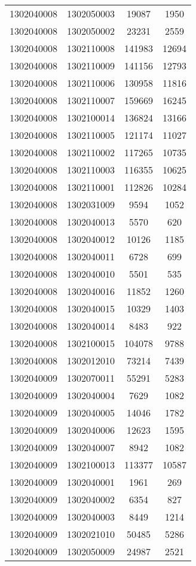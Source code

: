 \begin{longtable}[h]{llcc}
		1302040008 & 1302050003 & 19087 & 1950\\
		1302040008 & 1302050002 & 23231 & 2559\\
		1302040008 & 1302110008 & 141983 & 12694\\
		1302040008 & 1302110009 & 141156 & 12793\\
		1302040008 & 1302110006 & 130958 & 11816\\
		1302040008 & 1302110007 & 159669 & 16245\\
		1302040008 & 1302100014 & 136824 & 13166\\
		1302040008 & 1302110005 & 121174 & 11027\\
		1302040008 & 1302110002 & 117265 & 10735\\
		1302040008 & 1302110003 & 116355 & 10625\\
		1302040008 & 1302110001 & 112826 & 10284\\
		1302040008 & 1302031009 & 9594 & 1052\\
		1302040008 & 1302040013 & 5570 & 620\\
		1302040008 & 1302040012 & 10126 & 1185\\
		1302040008 & 1302040011 & 6728 & 699\\
		1302040008 & 1302040010 & 5501 & 535\\
		1302040008 & 1302040016 & 11852 & 1260\\
		1302040008 & 1302040015 & 10329 & 1403\\
		1302040008 & 1302040014 & 8483 & 922\\
		1302040008 & 1302100015 & 104078 & 9788\\
		1302040008 & 1302012010 & 73214 & 7439\\
		1302040009 & 1302070011 & 55291 & 5283\\
		1302040009 & 1302040004 & 7629 & 1082\\
		1302040009 & 1302040005 & 14046 & 1782\\
		1302040009 & 1302040006 & 12623 & 1595\\
		1302040009 & 1302040007 & 8942 & 1082\\
		1302040009 & 1302100013 & 113377 & 10587\\
		1302040009 & 1302040001 & 1961 & 269\\
		1302040009 & 1302040002 & 6354 & 827\\
		1302040009 & 1302040003 & 8449 & 1214\\
		1302040009 & 1302021010 & 50485 & 5286\\
		1302040009 & 1302050009 & 24987 & 2521\\

\end{longtable}
